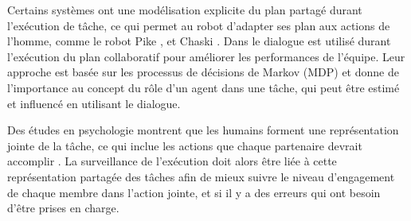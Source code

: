 \documentclass[a4paper,11pt,twoside]{StyleThese}
\begin{document}


Certains systèmes ont une modélisation explicite du plan partagé durant l'exécution de tâche, ce qui permet au robot d'adapter ses plan aux actions de l'homme, comme le robot Pike
\cite{levine2014concurrent,karpas2015robust}, et Chaski \cite{shah2011improved}.
Dans \cite{clair2015robot} le dialogue est utilisé durant l'exécution du plan collaboratif pour améliorer les performances de l'équipe. Leur approche est basée sur les processus de décisions de Markov (MDP) et donne de l'importance au concept du rôle d'un agent dans une tâche, qui peut être estimé et influencé en utilisant le dialogue.

Des études en psychologie montrent que les humains forment une représentation jointe de la tâche, ce qui inclue les actions que chaque partenaire devrait accomplir \cite{sebanz2006joint}. La surveillance de l'exécution doit alors être liée à cette représentation partagée des tâches afin de mieux suivre le niveau d'engagement de chaque membre dans l'action jointe, et si il y a des erreurs qui ont besoin d'être prises en charge.






 


\end{document}
